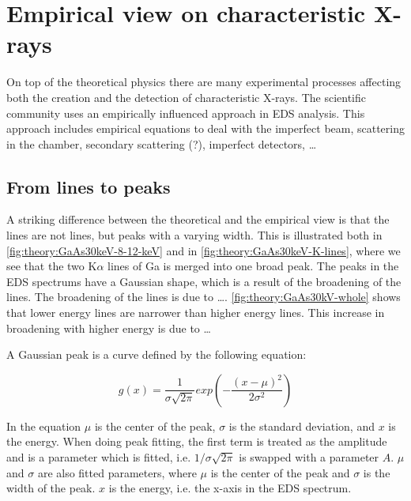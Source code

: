 




%
%
%
%
\section{Empirical view on characteristic X-rays}
\label{sec:theory:empirical}
On top of the theoretical physics there are many experimental processes affecting both the creation and the detection of characteristic X-rays.
The scientific community uses an empirically influenced approach in EDS analysis.
This approach includes empirical equations to deal with the imperfect beam, scattering in the chamber, secondary scattering (?), imperfect detectors, \dots


%
%
\subsection{From lines to peaks}
\label{sec:theory:empirical:peaks}
A striking difference between the theoretical and the empirical view is that the lines are not lines, but peaks with a varying width.
This is illustrated both in \cref{fig:theory:GaAs30keV-8-12-keV} and in \cref{fig:theory:GaAs30keV-K-lines}, where we see that the two K$\alpha$ lines of Ga is merged into one broad peak.
The peaks in the EDS spectrums have a Gaussian shape, which is a result of the broadening of the lines.
The broadening of the lines is due to \dots {}. %
\cref{fig:theory:GaAs30kV-whole} shows that lower energy lines are narrower than higher energy lines.
This increase in broadening with higher energy is due to \dots {}

A Gaussian peak is a curve defined by the following equation:

\begin{equation}
    \label{eq:theory:empirical:gaussian}
    g(x) = \frac{1}{\sigma \sqrt{2\pi}} exp({-\frac{(x-\mu)^2}{2\sigma^2}})
\end{equation}

In the equation $\mu$ is the center of the peak, $\sigma$ is the standard deviation, and $x$ is the energy.
When doing peak fitting, the first term is treated as the amplitude and is a parameter which is fitted, i.e. $1/\sigma\sqrt{2\pi}$ is swapped with a parameter $A$.
$\mu$ and $\sigma$ are also fitted parameters, where $\mu$ is the center of the peak and $\sigma$ is the width of the peak.
$x$ is the energy, i.e. the x-axis in the EDS spectrum.

